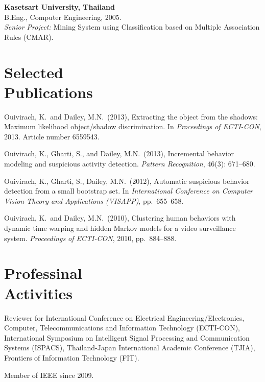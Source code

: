 \documentclass[margin, 10pt]{res}
\begin{document}
\begin{resume}
{\bf Kasetsart University, Thailand} \\
B.Eng., Computer Engineering, 2005. \\
{\it Senior Project:} Mining System using Classification based on Multiple
Association Rules (CMAR).

\section{Selected \\ Publications}

Ouivirach, K.\ and Dailey, M.N.\ (2013), Extracting the object from the shadows:
Maximum likelihood object/shadow discrimination. In {\it Proceedings of
ECTI-CON}, 2013. Article number 6559543.

Ouivirach, K., Gharti, S., and Dailey, M.N.\ (2013), Incremental behavior
modeling  and suspicious activity detection. {\it Pattern Recognition}, 46(3):
671--680.

Ouivirach, K., Gharti, S., Dailey, M.N.\ (2012), Automatic suspicious behavior
detection from a small bootstrap set. In {\it International Conference on
Computer Vision Theory and Applications (VISAPP)}, pp.\ 655--658.

Ouivirach, K.\ and Dailey, M.N.\ (2010), Clustering human behaviors with
dynamic time warping and hidden Markov models for a video surveillance system.
{\it Proceedings of ECTI-CON}, 2010, pp.\ 884--888.

\section{Professinal \\ Activities}

Reviewer for International Conference on Electrical Engineering/Electronics,
Computer, Telecommunications and Information Technology (ECTI-CON),
International Symposium on Intelligent Signal Processing and Communication
Systems (ISPACS), Thailand-Japan International Academic Conference (TJIA),
Frontiers of Information Technology (FIT).

Member of IEEE since 2009.

\end{resume}
\end{document}
